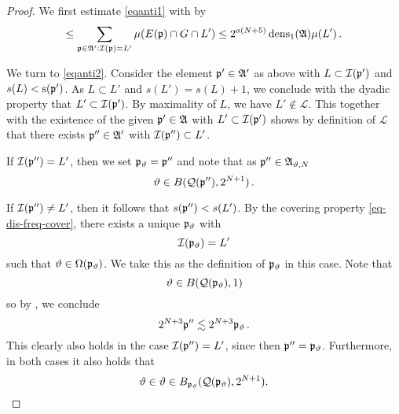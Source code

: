 \begin{proof}
We first estimate \eqref{eqanti1}
with  by
\begin{equation}\label{equanti1.5}
    \le \sum_{{\mathfrak p}\in\mathfrak{A}':{\mathcal{I}}({\mathfrak p})=L'}\mu(E({\mathfrak p})\cap G\cap L')\le 2^{a(N+5)}\operatorname{\operatorname{dens}}_1(\mathfrak{A})\mu(L')\, .
\end{equation}



We turn to \eqref{eqanti2}.
Consider the element ${\mathfrak p}'\in \mathfrak{A}'$ as above
with $L\subset {\mathcal{I}}({\mathfrak p}')$ and $s(L)<{\mathrm{s}}({\mathfrak p}')$.
As $L\subset L'$ and $s(L')=s(L)+1$, we conclude with the dyadic property that $L'\subset {\mathcal{I}}({\mathfrak p}')$.
By maximality of $L$, we have
$L'\not\in \mathcal{L}$.
This together with the existence of the given ${\mathfrak p}'\in \mathfrak{A}$
with $L'\subset {\mathcal{I}}({\mathfrak p}')$
shows by definition of $\mathcal{L}$ that there exists ${\mathfrak p}''\in \mathfrak{A}'$ with
${\mathcal{I}}({\mathfrak p}'')\subset L'$.

If ${\mathcal{I}}({\mathfrak p}'') = L'$, then we set ${\mathfrak p}_{{\vartheta}} = {\mathfrak p}''$ and note that as ${\mathfrak p}'' \in \mathfrak{A}_{{\vartheta},N}$
\begin{equation}
    {\vartheta} \in B({\mathcal{Q}}({\mathfrak p}''), 2^{N+1})\, .
\end{equation}

If ${\mathcal{I}}({\mathfrak p}'') \ne L'$, then it follows that $s({\mathfrak p}'') < s(L')$.
By the covering property \eqref{eq-dis-freq-cover}, there exists a unique ${\mathfrak p}_{{\vartheta}}$ with
\begin{equation*}
    {\mathcal{I}}({\mathfrak p}_{{\vartheta}})=L'
\end{equation*}
such that ${\vartheta}\in {\Omega}({\mathfrak p}_{{\vartheta}})$. We take this as the definition of ${\mathfrak p}_{\vartheta}$ in this case.
Note that
\begin{equation}
    {\vartheta}\in B({\mathcal{Q}}({\mathfrak p}_{{\vartheta}}), 1)
\end{equation}
so by , we conclude
\begin{equation}
    2^{N+3}{\mathfrak p}'' \lesssim 2^{N+3}{\mathfrak p}_{{\vartheta}} \, .
\end{equation}
This clearly also holds in the case ${\mathcal{I}}({\mathfrak p}'') = L'$, since then ${\mathfrak p}'' = {\mathfrak p}_{\vartheta}$. Furthermore,
in both cases it also holds that
\begin{equation}
    {\vartheta} \in {\vartheta}\in B_{{\mathfrak p}_{{\vartheta}}}({\mathcal{Q}}({\mathfrak p}_{{\vartheta}}), 2^{N+1}).
\end{equation}


\end{proof}
